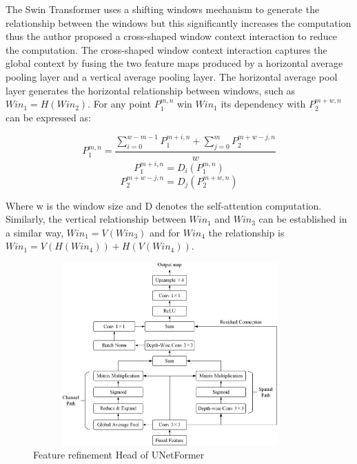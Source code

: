 The Swin Transformer uses a shifting windows mechanism to generate the relationship between the windows but this significantly increases the computation thus the author proposed  a cross-shaped window context interaction to reduce the computation. The cross-shaped window context interaction captures the global context by fusing the two feature maps produced by a horizontal average pooling layer and a vertical average pooling layer. The horizontal average pool layer generates the horizontal relationship between windows, such as $Win_1 = H(Win_2)$. For any point $P^{m,n}_1$ win $Win_1$ its dependency with $P^{m+w,n}_2$ can be expressed as:

\begin{equation}
    P^{m,n}_1 = \frac{\sum^{w-m-1}_{i=0}P^{m+i,n}_1 + \sum^m_{j=0}P^{m+w-j,n}_2}{w}
\end{equation}
\begin{equation}
    P^{m+i,n}_1 = D_i (P^{m,n}_1)
\end{equation}
\begin{equation}
    P^{m+w-j,n}_2 = D_j(P^{m+w,n}_2)
\end{equation}

\FloatBarrier
Where w is the window size and D denotes the self-attention computation. Similarly, the vertical relationship between $Win_1$ and $Win_3$ can be established in a similar way, $Win_1 = V(Win_3)$ and for $Win_4$ the relationship is $Win_1 = V(H(Win_4)) + H(V(Win_4))$. 

\FloatBarrier

\begin{figure}[ht]
\includegraphics[width=10.5cm, height=7cm]{images/frh.jpg}
\centering
\caption{Feature refinement Head of UNetFormer \protect\cite{unetformer}}
\label{fig:frh}
\end{figure}

\FloatBarrier

